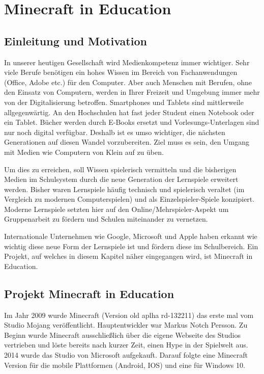 \chapter{Minecraft in Education}

\section{Einleitung und Motivation}

In unserer heutigen Gesellschaft wird Medienkompetenz immer wichtiger. Sehr viele Berufe benötigen ein hohes Wissen im Bereich von Fachanwendungen (Office, Adobe etc.) für den Computer. 
Aber auch Menschen mit Berufen, ohne den Einsatz von Computern, werden in Ihrer Freizeit und Umgebung immer mehr von der Digitalisierung betroffen.
Smartphones und Tablets sind mittlerweile allgegenwärtig. An den Hochschulen hat fast jeder Student einen Notebook oder ein Tablet.
Bücher werden durch E-Books ersetzt und Vorlesungs-Unterlagen sind nur noch digital verfügbar. Deshalb ist es umso wichtiger, die nächsten Generationen auf diesen Wandel vorzubereiten. 
Ziel muss es sein, den Umgang mit Medien wie Computern von Klein auf zu üben.

Um dies zu erreichen, soll Wissen spielerisch vermitteln und die bisherigen Medien im Schulsystem durch die neue Generation der Lernspiele erweitert werden.
Bisher waren Lernspiele häufig technisch und spielerisch veraltet (im Vergleich zu modernen Computerspielen) und als Einzelspieler-Spiele konzipiert. Moderne Lernspiele setzten hier auf den Online/Mehrspieler-Aspekt um Gruppenarbeit zu fördern und Schulen miteinander zu vernetzen.

Internationale Unternehmen wie Google, Microsoft und Apple haben erkannt wie wichtig diese neue Form der Lernspiele ist und fördern diese im Schulbereich.
Ein Projekt, auf welches in diesem Kapitel näher eingegangen wird, ist Minecraft in Education.

\section{Projekt Minecraft in Education}

Im Jahr 2009 wurde Minecraft (Version old aplha rd-132211) das erste mal vom
Studio Mojang veröffentlicht. Hauptentwickler war Markus Notch Persson. Zu Beginn wurde Minecraft
ausschließlich über die eigene Webseite des Studios vertrieben und löste bereits nach kurzer Zeit,
einen Hype in der Spielwelt aus. 2014 wurde das Studio von Microsoft aufgekauft. Darauf folgte eine Minecraft Version für die mobile Plattformen (Android, IOS) und eine für Windows 10.
\cite{WikiMinecraft}\cite{HeiseMicrosoft}

